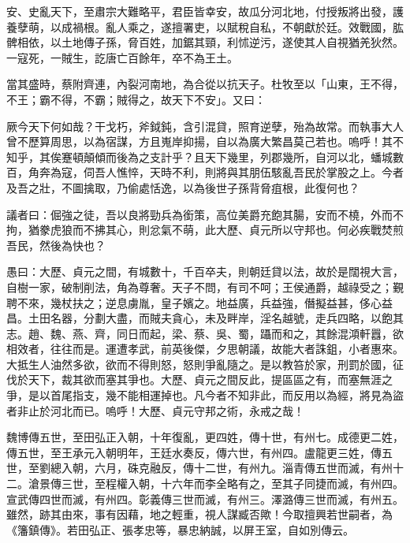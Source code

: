 
\begin{pinyinscope}

 安、史亂天下，至肅宗大難略平，君臣皆幸安，故瓜分河北地，付授叛將出發，護養孽萌，以成禍根。亂人乘之，遂擅署吏，以賦稅自私，不朝獻於廷。效戰國，肱髀相依，以土地傳子孫，脅百姓，加鋸其頸，利怵逆污，遂使其人自視猶羌狄然。一寇死，一賊生，訖唐亡百餘年，卒不為王土。



 當其盛時，蔡附齊連，內裂河南地，為合從以抗天子。杜牧至以「山東，王不得，不王；霸不得，不霸；賊得之，故天下不安」。又曰：



 厥今天下何如哉？干戈朽，斧鉞鈍，含引混貸，照育逆孽，殆為故常。而執事大人曾不歷算周思，以為宿謀，方且嵬岸抑揚，自以為廣大繁昌莫己若也。嗚呼！其不知乎，其俟蹇頓顛傾而後為之支計乎？且天下幾里，列郡幾所，自河以北，蟠城數百，角奔為寇，伺吾人憔悴，天時不利，則將與其朋伍駭亂吾民於掌股之上。今者及吾之壯，不圖擒取，乃偷處恬逸，以為後世子孫背脅疽根，此復何也？



 議者曰：倔強之徒，吾以良將勁兵為銜策，高位美爵充飽其腸，安而不橈，外而不拘，猶豢虎狼而不拂其心，則忿氣不萌，此大歷、貞元所以守邦也。何必疾戰焚煎吾民，然後為快也？



 愚曰：大歷、貞元之間，有城數十，千百卒夫，則朝廷貸以法，故於是闊視大言，自樹一家，破制削法，角為尊奢。天子不問，有司不呵；王侯通爵，越祿受之；覲聘不來，幾杖扶之；逆息虜胤，皇子嬪之。地益廣，兵益強，僭擬益甚，侈心益昌。土田名器，分劃大盡，而賊夫貪心，未及畔岸，淫名越號，走兵四略，以飽其志。趙、魏、燕、齊，同日而起，梁、蔡、吳、蜀，躡而和之，其餘混澒軒囂，欲相效者，往往而是。運遭孝武，前英後傑，夕思朝議，故能大者誅鉏，小者惠來。大抵生人油然多欲，欲而不得則怒，怒則爭亂隨之。是以教笞於家，刑罰於國，征伐於天下，裁其欲而塞其爭也。大歷、貞元之間反此，提區區之有，而塞無涯之爭，是以首尾指支，幾不能相運掉也。凡今者不知非此，而反用以為經，將見為盜者非止於河北而已。嗚呼！大歷、貞元守邦之術，永戒之哉！



 魏博傳五世，至田弘正入朝，十年復亂，更四姓，傳十世，有州七。成德更二姓，傳五世，至王承元入朝明年，王廷水奏反，傳六世，有州四。盧龍更三姓，傳五世，至劉總入朝，六月，硃克融反，傳十二世，有州九。淄青傳五世而滅，有州十二。滄景傳三世，至程權入朝，十六年而李全略有之，至其子同捷而滅，有州四。宣武傳四世而滅，有州四。彰義傳三世而滅，有州三。澤潞傳三世而滅，有州五。雖然，跡其由來，事有因藉，地之輕重，視人謀臧否歟！今取擅興若世嗣者，為《籓鎮傳》。若田弘正、張孝忠等，暴忠納誠，以屏王室，自如別傳云。




\end{pinyinscope}
